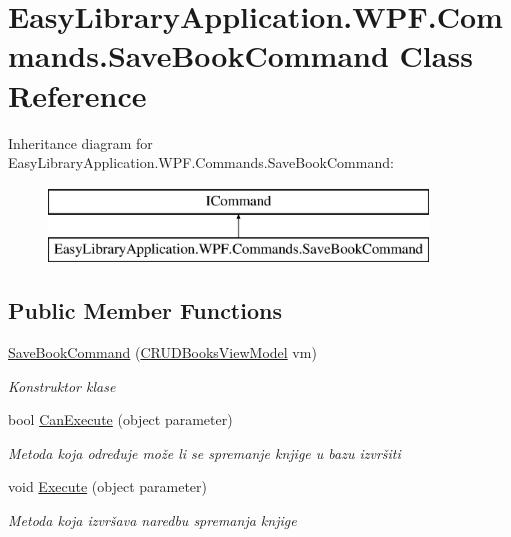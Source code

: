 \hypertarget{class_easy_library_application_1_1_w_p_f_1_1_commands_1_1_save_book_command}{}\section{Easy\+Library\+Application.\+W\+P\+F.\+Commands.\+Save\+Book\+Command Class Reference}
\label{class_easy_library_application_1_1_w_p_f_1_1_commands_1_1_save_book_command}
Inheritance diagram for Easy\+Library\+Application.\+W\+P\+F.\+Commands.\+Save\+Book\+Command\+:\begin{figure}[H]
\begin{center}
\leavevmode
\includegraphics[height=2.000000cm]{class_easy_library_application_1_1_w_p_f_1_1_commands_1_1_save_book_command}
\end{center}
\end{figure}
\subsection*{Public Member Functions}
\begin{DoxyCompactItemize}
\item 
\mbox{\hyperlink{class_easy_library_application_1_1_w_p_f_1_1_commands_1_1_save_book_command_aa2a6c71612c4f6c4999c996262f1c002}{Save\+Book\+Command}} (\mbox{\hyperlink{class_easy_library_application_1_1_w_p_f_1_1_view_model_1_1_c_r_u_d_books_view_model}{C\+R\+U\+D\+Books\+View\+Model}} vm)
\begin{DoxyCompactList}\small\item\em Konstruktor klase \end{DoxyCompactList}\item 
bool \mbox{\hyperlink{class_easy_library_application_1_1_w_p_f_1_1_commands_1_1_save_book_command_a745f41d1d605df1ef3f70416b59627b9}{Can\+Execute}} (object parameter)
\begin{DoxyCompactList}\small\item\em Metoda koja određuje može li se spremanje knjige u bazu izvršiti \end{DoxyCompactList}\item 
void \mbox{\hyperlink{class_easy_library_application_1_1_w_p_f_1_1_commands_1_1_save_book_command_afb07e46a8e432b025276d8adc29fd246}{Execute}} (object parameter)
\begin{DoxyCompactList}\small\item\em Metoda koja izvršava naredbu spremanja knjige \end{DoxyCompactList}\end{DoxyCompactItemize}
